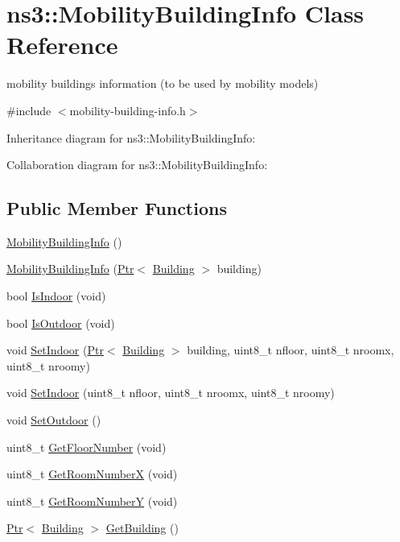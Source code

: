 \hypertarget{classns3_1_1MobilityBuildingInfo}{}\section{ns3\+:\+:Mobility\+Building\+Info Class Reference}
\label{classns3_1_1MobilityBuildingInfo}


mobility buildings information (to be used by mobility models)  




{\ttfamily \#include $<$mobility-\/building-\/info.\+h$>$}



Inheritance diagram for ns3\+:\+:Mobility\+Building\+Info\+:


Collaboration diagram for ns3\+:\+:Mobility\+Building\+Info\+:
\subsection*{Public Member Functions}
\begin{DoxyCompactItemize}
\item 
\hyperlink{classns3_1_1MobilityBuildingInfo_a4073309133fb2989fc92c6a509cd651b}{Mobility\+Building\+Info} ()
\item 
\hyperlink{classns3_1_1MobilityBuildingInfo_a463048a755b064a20984b1332c5fef5d}{Mobility\+Building\+Info} (\hyperlink{classns3_1_1Ptr}{Ptr}$<$ \hyperlink{classns3_1_1Building}{Building} $>$ building)
\item 
bool \hyperlink{classns3_1_1MobilityBuildingInfo_a2bba20054cc48efcca2d5e0c46f8171c}{Is\+Indoor} (void)
\item 
bool \hyperlink{classns3_1_1MobilityBuildingInfo_ae7fba237e7e3eaf40139bec948ec238a}{Is\+Outdoor} (void)
\item 
void \hyperlink{classns3_1_1MobilityBuildingInfo_ac1ca8e2b805e168f593d84732a9ea166}{Set\+Indoor} (\hyperlink{classns3_1_1Ptr}{Ptr}$<$ \hyperlink{classns3_1_1Building}{Building} $>$ building, uint8\+\_\+t nfloor, uint8\+\_\+t nroomx, uint8\+\_\+t nroomy)
\item 
void \hyperlink{classns3_1_1MobilityBuildingInfo_acd31ddb799c1e949e44e10a9e9547301}{Set\+Indoor} (uint8\+\_\+t nfloor, uint8\+\_\+t nroomx, uint8\+\_\+t nroomy)
\item 
void \hyperlink{classns3_1_1MobilityBuildingInfo_ac804a6c98e041d9c7c61ed6792f95c77}{Set\+Outdoor} ()
\item 
uint8\+\_\+t \hyperlink{classns3_1_1MobilityBuildingInfo_aedb2647206f2dae0aa98ec9ac11873c7}{Get\+Floor\+Number} (void)
\item 
uint8\+\_\+t \hyperlink{classns3_1_1MobilityBuildingInfo_ad40faf32d419734e8c86f630e66ab18d}{Get\+Room\+NumberX} (void)
\item 
uint8\+\_\+t \hyperlink{classns3_1_1MobilityBuildingInfo_a5297704859be8e1d3ad22ea3f5f93dbd}{Get\+Room\+NumberY} (void)
\item 
\hyperlink{classns3_1_1Ptr}{Ptr}$<$ \hyperlink{classns3_1_1Building}{Building} $>$ \hyperlink{classns3_1_1MobilityBuildingInfo_a15d4ac25e557d51b356610354c70c6fb}{Get\+Building} ()
\end{DoxyCompactItemize}
